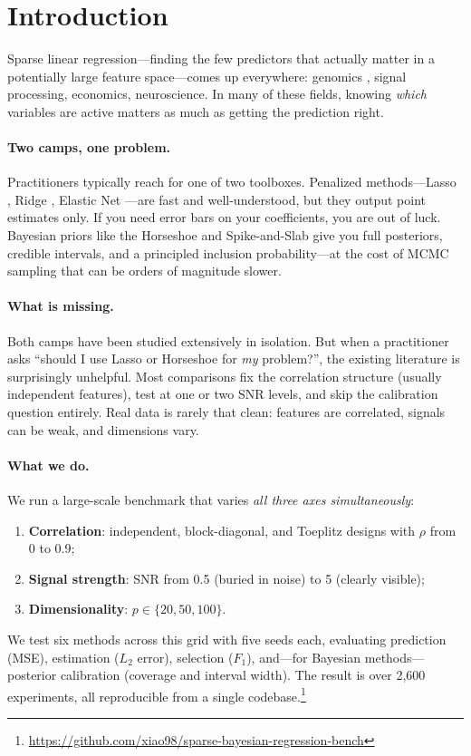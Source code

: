 \section{Introduction}
\label{sec:introduction}

Sparse linear regression---finding the few predictors that actually matter in a potentially large feature space---comes up everywhere: genomics \citep{tibshirani1996regression}, signal processing, economics, neuroscience.
In many of these fields, knowing \emph{which} variables are active matters as much as getting the prediction right.

\paragraph{Two camps, one problem.}
Practitioners typically reach for one of two toolboxes.
Penalized methods---Lasso \citep{tibshirani1996regression}, Ridge \citep{hoerl1970ridge}, Elastic Net \citep{zou2005regularization}---are fast and well-understood, but they output point estimates only.
If you need error bars on your coefficients, you are out of luck.
Bayesian priors like the Horseshoe \citep{carvalho2010horseshoe} and Spike-and-Slab \citep{mitchell1988bayesian} give you full posteriors, credible intervals, and a principled inclusion probability---at the cost of MCMC sampling that can be orders of magnitude slower.

\paragraph{What is missing.}
Both camps have been studied extensively in isolation.
But when a practitioner asks ``should I use Lasso or Horseshoe for \emph{my} problem?'', the existing literature is surprisingly unhelpful.
Most comparisons fix the correlation structure (usually independent features), test at one or two SNR levels, and skip the calibration question entirely.
Real data is rarely that clean: features are correlated, signals can be weak, and dimensions vary.

\paragraph{What we do.}
We run a large-scale benchmark that varies \emph{all three axes simultaneously}:
\begin{enumerate}[nosep]
    \item \textbf{Correlation}: independent, block-diagonal, and Toeplitz designs with $\rho$ from 0 to 0.9;
    \item \textbf{Signal strength}: SNR from 0.5 (buried in noise) to 5 (clearly visible);
    \item \textbf{Dimensionality}: $p \in \{20, 50, 100\}$.
\end{enumerate}
We test six methods across this grid with five seeds each, evaluating prediction (MSE), estimation ($L_2$ error), selection ($F_1$), and---for Bayesian methods---posterior calibration (coverage and interval width).
The result is over 2{,}600 experiments, all reproducible from a single codebase.\footnote{\url{https://github.com/xiao98/sparse-bayesian-regression-bench}}

